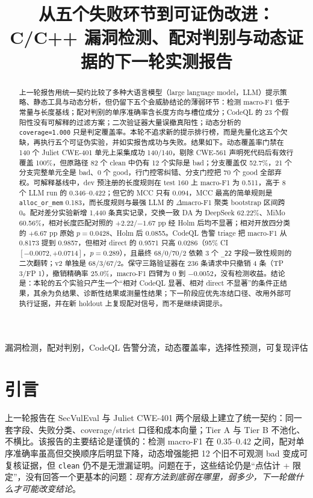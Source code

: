\documentclass[conference]{IEEEtran}
\title{从五个失败环节到可证伪改进：\\C/C++ 漏洞检测、配对判别与动态证据的下一轮实测报告}
\author{
\IEEEauthorblockN{Yu Zhang}
\IEEEauthorblockA{CS224 课程项目\\
ShanghaiTech University\\
Shanghai, China\\
\href{mailto:Zhangyu12026@shanghaitech.edu.cn}{Zhangyu12026@shanghaitech.edu.cn}}
}
\begin{document}
\maketitle

\begin{abstract}
上一轮报告用统一契约比较了多种大语言模型（large language model，LLM）提示策略、静态工具与动态分析，但仍留下五个会威胁结论的薄弱环节：检测 macro-F1 低于常量与长度基线；配对判别的单序准确率含长度方向与槽位成分；CodeQL 的 23 个假阳性没有可解释的过滤方案；二次验证器大量误撤真阳性；动态分析的 \texttt{coverage=1.000} 只是判定覆盖率。本轮不追求新的提示排行榜，而是先量化这五个欠缺，再执行五个可证伪实验，并如实报告成功与失败。结果如下。动态覆盖率门禁在 140 个 Juliet CWE-401 单元上采集成功 140/140，剔除 CWE-561 声明死代码后有效行覆盖 100\%，但原路径 82 个 clean 中仍有 12 个实际是 bad；分支覆盖仅 52.7\%，21 个分支完整单元全是 bad、0 个 good，行门控零纠错、分支门控把 70 个 good 全部弃权。可解释基线中，dev 预注册的长度规则在 test 160 上 macro-F1 为 0.511，高于 8 个 LLM run 的 0.346--0.422；但它的 MCC 只有 0.094，MCC 最高的简单规则是 \texttt{alloc\_or\_mem} 0.183，而长度规则与最强 LLM 的 $\Delta$macro-F1 聚类 bootstrap 区间跨 0。配对差分实验新增 1{,}440 条真实记录，交换一致 DA 为 DeepSeek 62.22\%、MiMo 60.56\%，相对长度匹配对照的 $+2.22$/$-1.67$ pp 经 Holm 后均不显著；相对开放四分类的 $+6.67$ pp 原始 $p=0.0428$、Holm 后 0.0855。CodeQL 告警 triage 把 macro-F1 从 0.8173 提到 0.9857，但相对 direct 的 0.9571 只高 0.0286（95\% CI $[-0.0072,+0.0714]$，$p=0.289$），且最终 68/0/70/2 依赖 3 个 \texttt{\_22} 字段一致性规则的二次翻转；v2 单独是 68/3/67/2。保守三路验证器在 236 条请求中只撤销 4 条（TP 3/FP 1），撤销精确率 25.0\%，macro-F1 四臂为 0 到 $-0.0052$，没有检测收益。结论是：本轮的五个实验只产生一个“相对 CodeQL 显著、相对 direct 不显著”的条件正结果，其余为负结果、诊断性结果或测量性结果；下一阶段应优先冻结口径、改用外部可执行证据，并在新 holdout 上复现配对信号，而不是继续调提示。
\end{abstract}

\begin{IEEEkeywords}
漏洞检测，配对判别，CodeQL 告警分流，动态覆盖率，选择性预测，可复现评估
\end{IEEEkeywords}

\section{引言}
\label{sec:intro}

上一轮报告在 SecVulEval 与 Juliet CWE-401 两个层级上建立了统一契约：同一套字段、失败分类、coverage/strict 口径和成本向量；Tier A 与 Tier B 不池化、不横比。该报告的主要结论是谨慎的：检测 macro-F1 在 0.35--0.42 之间，配对单序准确率虽高但交换顺序后明显下降，动态增强能把 12 个旧不可观测 bad 变成可复核证据，但 \texttt{clean} 仍不是无泄漏证明。问题在于，这些结论仍是“点估计 + 限定”，没有回答一个更基本的问题：\emph{现有方法到底弱在哪里，弱多少，下一轮做什么才可能改变结论}。
\end{document}
